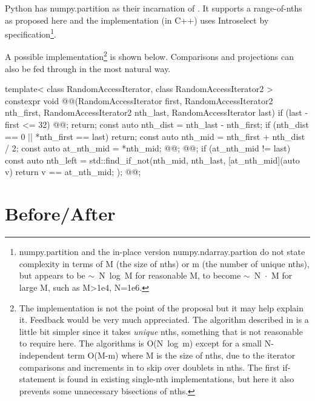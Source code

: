 Python has numpy.partition\cite{NpPart} as their incarnation of .
It supports a range-of-nths as proposed here and the implementation\cite{NPImpl} (in C++) uses \mbox{Introselect\cite{Musser1997}} by specification\footnote{numpy.partition and the in-place version numpy.ndarray.partion do not state complexity in terms of M (the size of nths) or m (the number of unique nths), but appears to be \mbox{$\sim$ N log M} for reasonable M, to become \mbox{$\sim$ N $\cdot$ M} for large M, such as M>1e4, N=1e6. }.

A possible implementation\footnote{
The implementation is not the point of the proposal but it may help explain it. Feedback would be very much appreciated. 
The algorithm described in \cite{Alsuwaiyel2001} is a little bit simpler since it takes \emph{unique} nths, something that is not reasonable to require here. The algorithms is \mbox{O(N log m)} except for a small N-independent term \mbox{O(M-m)} where M is the size of nths, due to the iterator comparisons and increments in  to skip over doublets in nths. The first if-statement is found in existing single-nth  implementations, but here it also prevents some unnecessary bisections of nths.}
is shown below. Comparisons and projections can also be fed through in the most natural way. 

\begin{codeblock}
template< class RandomAccessIterator, class RandomAccessIterator2 >
constexpr void @@(RandomAccessIterator first, 
  RandomAccessIterator2 nth_first, RandomAccessIterator2 nth_last, 
  RandomAccessIterator last)
{
  if (last - first <= 32) { @@; return; }
  const auto nth_dist = nth_last - nth_first;
  if (nth_dist == 0 || *nth_first == last) return;
  const auto nth_mid = nth_first + nth_dist / 2;
  const auto at_nth_mid = *nth_mid;
  @@;
  @@;
  if (at_nth_mid != last){
    const auto nth_left = std::find_if_not(nth_mid, nth_last, 
      [at_nth_mid](auto v) {return v == at_nth_mid; });
    @@;
  }
}

\end{codeblock}


\section{Before/After}

